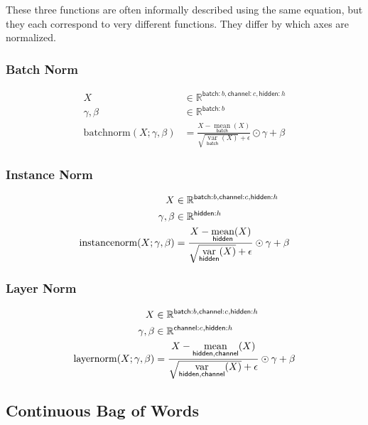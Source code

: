 \documentclass{article}
\newcommand{\name}[1]{\mathsf{#1}}
\newcommand{\nset}[2]{\name{#1}:#2}
\newcommand{\nfun}[2]{\mathop{\text{#2}}\limits_{\name{#1}}}
\newcommand{\reals}{\mathbb{R}}
\begin{document}
These three functions are often informally described using the same
equation, but they each correspond to very different functions. They differ
by which axes are normalized.

\subsubsection*{Batch Norm}

\begin{align*} 
X &\in \reals^{{\nset{batch}{b}, \nset{channel}{c}, \nset{hidden}{h}}}\\
\gamma, \beta &\in \reals^{{\nset{batch}{b}}} \\
\text{batchnorm}(X; \gamma, \beta) &= \frac{X - \nfun{batch}{mean}(X)}{\sqrt{\nfun{batch}{var}(X)} + \epsilon} \odot \gamma + \beta
\end{align*}


\subsubsection*{Instance Norm}

\begin{align*} 
X &\in \reals^{{\nset{batch}{b}, \nset{channel}{c}, \nset{hidden}{h}}}\\
\gamma, \beta &\in \reals^{{\nset{hidden}{h}}} \\
\text{instancenorm}(X; \gamma, \beta) &= \frac{X - \nfun{hidden}{\text{mean}}(X)}{\sqrt{\nfun{hidden}{\text{var}}(X)} + \epsilon} \odot \gamma + \beta
\end{align*}

\subsubsection*{Layer Norm}

\begin{align*} 
X &\in \reals^{{\nset{batch}{b}, \nset{channel}{c}, \nset{hidden}{h}}} \\
\gamma, \beta &\in \reals^{{\nset{channel}{c}, \nset{hidden}{h}}} \\
\text{layernorm}(X; \gamma, \beta) &= \frac{X - \nfun{hidden,channel}{\text{mean}}(X)}{\sqrt{\nfun{hidden, channel}{\text{var}}(X)} + \epsilon} \odot \gamma + \beta 
\end{align*}


\subsection{Continuous Bag of Words}
\end{document}
